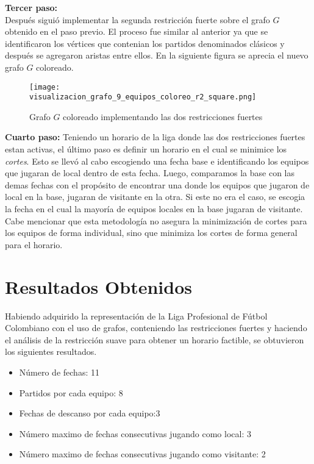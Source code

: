\documentclass[11pt]{article}
\begin{document}
\begin{multicols}{2}
            \textbf{Tercer paso:}\\ 
            Después siguió implementar la segunda restricción fuerte sobre el grafo $G$ obtenido en el paso previo.
            El proceso fue similar al anterior ya que se identificaron los vértices que contenian los 
            partidos denominados clásicos y después se agregaron aristas entre ellos. En la siguiente figura se aprecia el nuevo grafo $G$ coloreado.
            \begin{figure}[H]
                \begin{center}
                    \texttt{[image: visualizacion\_grafo\_9\_equipos\_coloreo\_r2\_square.png]}  
                \caption{Grafo $G$ coloreado implementando las dos restricciones fuertes}
                \end{center}
            \end{figure}
            \textbf{Cuarto paso:}
            Teniendo un horario de la liga donde las dos restricciones fuertes estan activas, el último paso es definir un horario en el cual se minimice los \textit{cortes}.
            Esto se llevó al cabo escogiendo una fecha base e identificando los equipos que jugaran de local dentro de esta fecha. Luego, comparamos 
            la base con las demas fechas con el propósito de encontrar una donde los equipos que jugaron de local en la base, jugaran de visitante en la otra.
            Si este no era el caso, se escogia la fecha en el cual la mayoría de equipos locales en la base jugaran de visitante.   
            Cabe mencionar que esta metodología no asegura la minimización de cortes para los equipos de forma individual, sino que minimiza los cortes de forma general para el horario. 

        \section{Resultados Obtenidos}
            Habiendo adquirido la representación de la Liga Profesional de Fútbol Colombiano con el uso de grafos, conteniendo las restricciones fuertes y haciendo el análisis de la 
            restricción suave para obtener un horario factible, se obtuvieron los siguientes resultados.
            \begin{itemize}
                \item Número de fechas: 11
                \item Partidos por cada equipo: 8
                \item Fechas de descanso por cada equipo:3
                \item Número maximo de fechas consecutivas jugando como local: 3
                \item Número maximo de fechas consecutivas jugando como visitante: 2
            \end{itemize}


\end{multicols}
\end{document}
